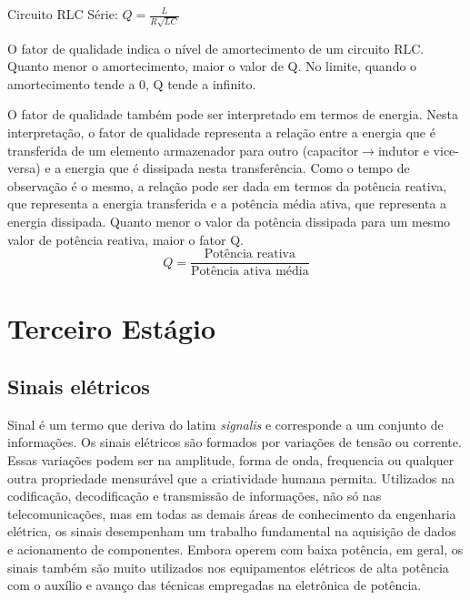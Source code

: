 \documentclass[12pt,fleqn]{book} %
\begin{document}
{Circuito RLC Série: $Q=\frac{L}{R\sqrt{LC}}$

O fator de qualidade indica o nível de amortecimento de um circuito RLC. Quanto menor o amortecimento, maior o valor de Q. No limite, quando o amortecimento tende a 0, Q tende a infinito.

O fator de qualidade também pode ser interpretado em termos de energia. Nesta interpretação, o fator de qualidade representa a relação entre a energia que é transferida de um elemento armazenador para outro (capacitor$\rightarrow$indutor e vice-versa) e a energia que é dissipada nesta transferência. Como o tempo de observação é o mesmo, a relação pode ser dada em termos da potência reativa, que representa a energia transferida e a potência média ativa, que representa a energia dissipada. Quanto menor o valor da potência dissipada para um mesmo valor de potência reativa, maior o fator Q.
$$Q=\frac{\text{Potência reativa}}{\text{Potência ativa média}}$$

}             

\part{Terceiro Estágio}

	
\chapter{Sinais elétricos}

Sinal é um termo que deriva do latim \textit{signalis} e corresponde a um conjunto de informações. Os sinais elétricos são formados por variações de tensão ou corrente. Essas variações podem ser na amplitude, forma de onda, frequencia ou qualquer outra propriedade mensurável que a criatividade humana permita. Utilizados na codificação, decodificação e transmissão de informações, não só nas telecomunicações, mas em todas as demais áreas de conhecimento da engenharia elétrica, os sinais desempenham um trabalho fundamental na aquisição de dados e acionamento de componentes. Embora operem com baixa potência, em geral, os sinais também são muito utilizados nos equipamentos elétricos de alta potência com o auxílio e avanço das técnicas empregadas na eletrônica de potência.
\end{document}
